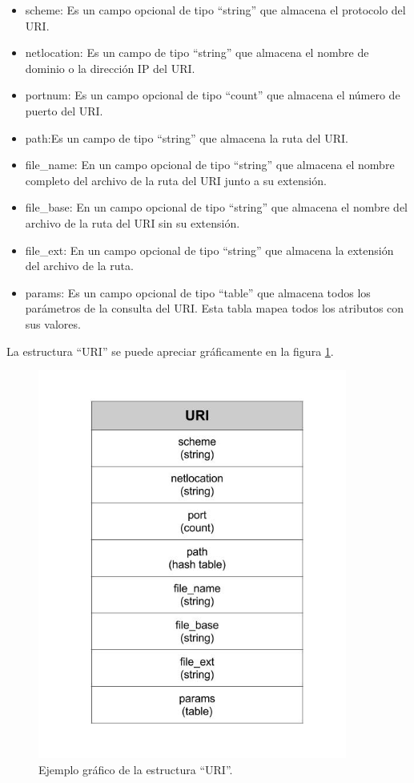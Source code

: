 \begin{itemize}
\item scheme: Es un campo opcional de tipo ``string'' que almacena el protocolo del URI.

\item netlocation: Es un campo de tipo ``string'' que almacena el nombre de dominio o la dirección IP del URI.

\item portnum: Es un campo opcional de tipo ``count''  que almacena el número de puerto del URI.
\item path:Es un campo de tipo ``string'' que almacena la ruta del URI.

\item file\_name: En un campo opcional de tipo ``string'' que almacena el nombre completo  del archivo de la ruta del URI junto a su extensión.

\item file\_base: En un campo opcional de tipo ``string'' que almacena el nombre  del archivo de la ruta del URI sin su extensión.

\item file\_ext: En un campo opcional de tipo ``string'' que almacena la extensión del archivo de la ruta.

\item params: Es un campo opcional de tipo ``table'' que almacena todos los parámetros de la consulta del URI. Esta tabla mapea todos los atributos con sus valores.

\end{itemize}

La estructura ``URI'' se puede apreciar gráficamente en la figura \ref{fig:URI}.

\begin{figure}[!htb]
\begin{center}
\includegraphics[width=4in]{./img/URIstruct.jpg}
\caption{Ejemplo gráfico de la estructura ``URI''.}
\label{fig:URI}
\end{center}
\end{figure}	



